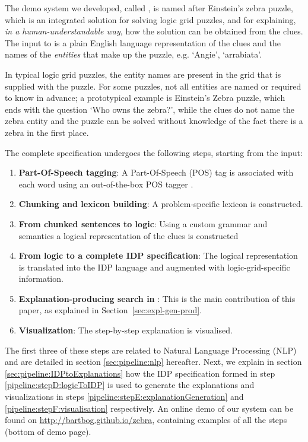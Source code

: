 The demo system we developed, called \ourtool, is named after Einstein's zebra puzzle, which is an integrated solution for solving logic grid puzzles, and for explaining, \textit{in a human-understandable way}, how the solution can be obtained from the clues. 
The input to \ourtool is a plain English language representation of the clues and the names of the \textit{entities} that make up the puzzle, e.g. `Angie', `arrabiata'. 

In typical logic grid puzzles, the entity names are present in the grid that is supplied with the puzzle. For some puzzles, not all entities are named or required to know in advance; a prototypical example is Einstein's Zebra puzzle, which ends with the question `Who owns the zebra?', while the clues do not name the zebra entity and the puzzle can be solved without knowledge of the fact there is a zebra in the first place.

The complete specification undergoes the following steps, starting from the input:

\begin{enumerate}[label=\textbf{\Alph*},ref=\emph{Step~\Alph*}]
	\item \label{pipeline:stepA:POS} \textbf{Part-Of-Speech tagging}: A Part-Of-Speech (POS) tag is associated with each word using an out-of-the-box POS tagger \cite{DBLP:journals/coling/MarcusSM94}.
	\item \label{pipeline:stepB:chukingLexicon} \textbf{Chunking and lexicon building}: A problem-specific lexicon is constructed.
	\item \label{pipeline:stepC:ChunkedToLogic} \textbf{From chunked sentences to logic}: Using a custom grammar and semantics a logical representation of the clues is constructed
	\item \label{pipeline:stepD:logicToIDP} \textbf{From logic to a complete IDP specification}: The logical representation is translated into the IDP language and augmented with logic-grid-specific information.
	\item \label{pipeline:stepE:explanationGeneration} \textbf{Explanation-producing search in \idp}: This is the main contribution of this paper, as explained in Section~\ref{sec:expl-gen-prod}.
	\item \label{pipeline:stepF:visualisation} \textbf{Visualization}: The step-by-step explanation is visualised. 
\end{enumerate}

The first three of these steps are related to Natural Language Processing (NLP) and are detailed in section \ref{sec:pipeline:nlp} hereafter. 
Next, we explain in section \ref{sec:pipeline:IDPtoExplanations} how the IDP specification formed in step \ref{pipeline:stepD:logicToIDP} is used to generate the explanations and visualizations in steps \ref{pipeline:stepE:explanationGeneration} and \ref{pipeline:stepF:visualisation} respectively.
An online demo of our system can be found on \url{http://bartbog.github.io/zebra}, containing examples of all the steps (bottom of demo page). 

